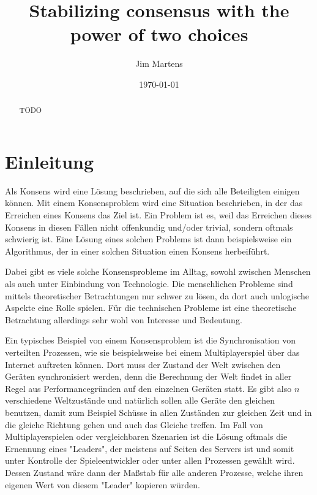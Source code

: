 \documentclass[12pt,ngerman,a4paper]{scrartcl}
\title{Stabilizing consensus with the power of two choices}
\author{Jim Martens}
\date{\today}
\theoremstyle{plain}
\theoremstyle{definition}
\theoremstyle{remark}
\begin{document}
\maketitle

\begin{abstract}
TODO
\end{abstract}

\tableofcontents

\newpage
\section{Einleitung}

Als Konsens wird eine Lösung beschrieben, auf die sich alle Beteiligten einigen
können. Mit einem Konsensproblem wird eine Situation beschrieben, in der das
Erreichen eines Konsens das Ziel ist. Ein Problem ist es, weil das Erreichen
dieses Konsens in diesen Fällen nicht offenkundig und/oder trivial, sondern
oftmals schwierig ist. Eine Lösung eines solchen Problems ist dann
beispielsweise ein Algorithmus, der in einer solchen Situation einen Konsens
herbeiführt.

Dabei gibt es viele solche Konsensprobleme im Alltag, sowohl zwischen Menschen
als auch unter Einbindung von Technologie. Die menschlichen Probleme sind
mittels theoretischer Betrachtungen nur schwer zu lösen, da dort auch unlogische
Aspekte eine Rolle spielen. Für die technischen Probleme ist eine theoretische
Betrachtung allerdings sehr wohl von Interesse und Bedeutung.

Ein typisches
Beispiel von einem Konsensproblem ist die Synchronisation von verteilten
Prozessen, wie sie beispielsweise bei einem Multiplayerspiel über das Internet
auftreten können. Dort muss der Zustand der Welt zwischen den Geräten
synchronisiert werden, denn die Berechnung der Welt findet in aller Regel aus
Performancegründen auf den einzelnen Geräten statt. Es gibt also $n$ verschiedene
Weltzustände und natürlich sollen alle Geräte den gleichen benutzen, damit
zum Beispiel Schüsse in allen Zuständen zur gleichen Zeit und in die gleiche
Richtung gehen und auch das Gleiche treffen. Im Fall von Multiplayerspielen
oder vergleichbaren Szenarien ist die Lösung oftmals die Ernennung eines "Leaders",
der meistens auf Seiten des Servers ist und somit unter Kontrolle der
Spieleentwickler oder unter allen Prozessen gewählt wird. Dessen Zustand wäre
dann der Maßstab für alle anderen Prozesse, welche ihren eigenen Wert von diesem
"Leader" kopieren würden.
\end{document}
